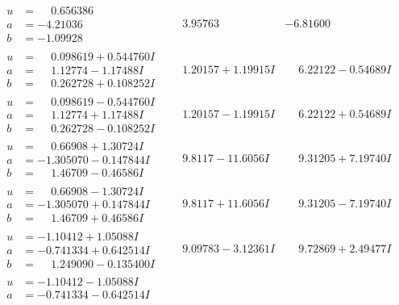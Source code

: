 \documentclass[1p]{elsarticle_modified}
\theoremstyle{definition}
\begin{document}
$$\begin{array}{c|c|c}
\begin{aligned}
u &= \phantom{-}0.656386\phantom{ +0.000000I} \\
a &= -4.21036\phantom{ +0.000000I} \\
b &= -1.09928\phantom{ +0.000000I}\end{aligned}
 & \phantom{-}3.95763\phantom{ +0.000000I} & -6.81600\phantom{ +0.000000I} \\ \hline\begin{aligned}
u &= \phantom{-}0.098619 + 0.544760 I \\
a &= \phantom{-}1.12774 - 1.17488 I \\
b &= \phantom{-}0.262728 + 0.108252 I\end{aligned}
 & \phantom{-}1.20157 + 1.19915 I & \phantom{-}6.22122 - 0.54689 I \\ \hline\begin{aligned}
u &= \phantom{-}0.098619 - 0.544760 I \\
a &= \phantom{-}1.12774 + 1.17488 I \\
b &= \phantom{-}0.262728 - 0.108252 I\end{aligned}
 & \phantom{-}1.20157 - 1.19915 I & \phantom{-}6.22122 + 0.54689 I \\ \hline\begin{aligned}
u &= \phantom{-}0.66908 + 1.30724 I \\
a &= -1.305070 - 0.147844 I \\
b &= \phantom{-}1.46709 - 0.46586 I\end{aligned}
 & \phantom{-}9.8117 - 11.6056 I & \phantom{-}9.31205 + 7.19740 I \\ \hline\begin{aligned}
u &= \phantom{-}0.66908 - 1.30724 I \\
a &= -1.305070 + 0.147844 I \\
b &= \phantom{-}1.46709 + 0.46586 I\end{aligned}
 & \phantom{-}9.8117 + 11.6056 I & \phantom{-}9.31205 - 7.19740 I \\ \hline\begin{aligned}
u &= -1.10412 + 1.05088 I \\
a &= -0.741334 + 0.642514 I \\
b &= \phantom{-}1.249090 - 0.135400 I\end{aligned}
 & \phantom{-}9.09783 - 3.12361 I & \phantom{-}9.72869 + 2.49477 I \\ \hline\begin{aligned}
u &= -1.10412 - 1.05088 I \\
a &= -0.741334 - 0.642514 I \\

\end{aligned}
\end{array}$$
\end{document}
